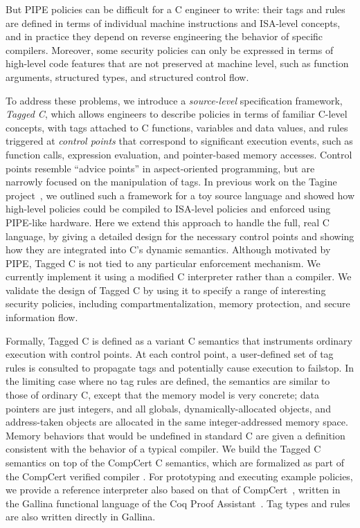 \documentclass{llncs}
\begin{document}
But PIPE policies can be difficult for a C engineer to write: their tags and rules
are defined in terms of individual machine instructions and ISA-level
concepts, and in practice they depend on reverse engineering the behavior
of specific compilers. 
Moreover, some security policies can only be expressed in terms of high-level code
features that are not preserved at machine level, such as function
arguments, structured types, and structured control flow.

To address these problems, we introduce a \emph{source-level} specification framework, \emph{Tagged C},
which allows engineers to describe policies in terms of familiar C-level concepts, with tags attached to
C functions, variables and data values, and rules triggered at \emph{control points} that correspond to
significant execution events, such as function calls, expression evaluation, and pointer-based memory accesses. 
Control points resemble ``advice points'' in aspect-oriented programming, but are narrowly
focused on the manipulation of tags.
In previous work on the Tagine project~\cite{Chhak21:Tagine}, we outlined such a framework for a toy
source language and showed how high-level policies could be compiled to ISA-level policies and 
enforced using PIPE-like hardware.  Here we extend this approach to handle
the full, real C language, by giving a detailed design for the necessary control points and
showing how they are integrated into C's dynamic semantics. 
Although motivated by PIPE, Tagged C is not tied to any particular enforcement mechanism. 
We currently implement it using a modified C interpreter rather than a compiler.
We validate the design of Tagged C by using it to specify a range of interesting security policies,
including compartmentalization, memory protection, and secure information flow.


Formally, Tagged C is defined as a variant C semantics that instruments ordinary execution with control points.
At each control point, a user-defined set of tag rules is consulted to propagate tags and potentially cause
execution to failstop. In the limiting case where no tag rules are defined, the semantics are similar to
those of ordinary C, except that the memory model is very concrete; 
data pointers are just integers, and all globals, dynamically-allocated objects,
and address-taken objects are allocated in the same integer-addressed memory space. Memory behaviors
that would be undefined in standard C are given a definition %
consistent with the behavior of a typical compiler.
We build the Tagged C semantics on top of the CompCert C semantics, which are formalized 
as part of the CompCert verified compiler \cite{Leroy09:CompCert}. For prototyping and executing example policies,
we provide a reference interpreter also based on that of CompCert~\cite[Ch. 4]{Leroy22:CompCertManual},
written in the Gallina functional language of the Coq Proof Assistant~\cite{coq}.
Tag types and rules are also written directly in Gallina. 
\end{document}

